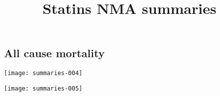 \documentclass[a4paper]{article}
\title{Statins NMA summaries}
\begin{document}
\subsection*{All cause mortality}


\texttt{[image: summaries-004]}

\texttt{[image: summaries-005]}
\end{document}
